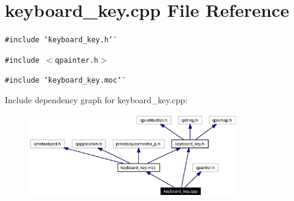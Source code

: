 \section{keyboard\_\-key.cpp File Reference}
\label{keyboard__key_8cpp}


{\tt \#include \char`\"{}keyboard\_\-key.h\char`\"{}}\par
{\tt \#include $<$qpainter.h$>$}\par
{\tt \#include \char`\"{}keyboard\_\-key.moc\char`\"{}}\par


Include dependency graph for keyboard\_\-key.cpp:\begin{figure}[H]
\begin{center}
\leavevmode
\includegraphics[width=259pt]{keyboard__key_8cpp__incl}
\end{center}
\end{figure}
